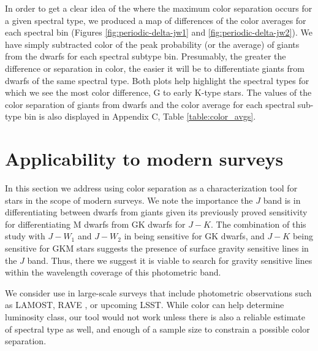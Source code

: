 In order to get a clear idea of the where the maximum color separation occurs for a given spectral type, we produced a map of differences of the color averages for each spectral bin (Figures \ref{fig:periodic-delta-jw1} and \ref{fig:periodic-delta-jw2}). We have simply subtracted color of the peak probability (or the average) of giants from the dwarfs for each spectral subtype bin. Presumably, the greater the difference or separation in color, the easier it will be to differentiate giants from dwarfs of the same spectral type. Both plots help highlight the spectral types for which we see the most color difference, G to early K-type stars. The values of the color separation of giants from dwarfs and the color average for each spectral sub-type bin is also displayed in Appendix C, Table \ref{table:color_avgs}.

\section{Applicability to modern surveys}
In this section we address using color separation as a characterization tool for stars in the scope of modern surveys. We note the importance the $J$ band is in differentiating between dwarfs from giants given its previously proved sensitivity for differentiating M dwarfs from GK dwarfs for $J-K$. The combination of this study with $J-W_{1}$ and $J-W_{2}$ in being sensitive for GK dwarfs, and $J-K$ being sensitive for GKM stars suggests the presence of surface gravity sensitive lines in the $J$ band. Thus, there we suggest it is viable to search for gravity sensitive lines within the wavelength coverage of this photometric band. 


We consider use in large-scale  surveys that include photometric observations such as LAMOST, RAVE , or upcoming LSST. While color can help determine luminosity class, our tool would not work unless there is also a reliable estimate of spectral type as well, and enough of a sample size to constrain a possible color separation.

